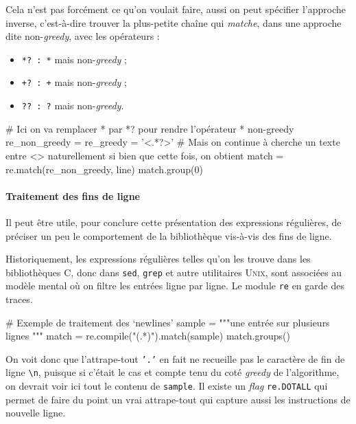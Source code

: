 Cela n'est pas forcément ce qu'on voulait faire, aussi on peut spécifier l'approche inverse, c'est-à-dire trouver la plus-petite chaîne qui \textit{matche}, dans une approche dite non-\textit{greedy}, avec les opérateurs :
\begin{itemize}\jazzitem
\item \texttt{*? : *} mais non-\textit{greedy} ;
\item \texttt{+? : +} mais non-\textit{greedy} ;
\item \texttt{?? : ?} mais non-\textit{greedy}.
\end{itemize}

\begin{idleconsole*}
	\begin{pyconsole}
# Ici on va remplacer * par *? pour rendre l'opérateur * non-greedy
re_non_greedy = re_greedy = '<.*?>'
# Mais on continue à cherche un texte entre <> naturellement si bien que cette fois, on obtient
match = re.match(re_non_greedy, line)
match.group(0)
	\end{pyconsole}
\end{idleconsole*}

\vspace{1pt}%

\paragraph{Traitement des fins de ligne}
Il peut être utile, pour con\-clure cette présentation des expressions régulières, de préciser un peu le comportement de la bibliothèque vis-à-vis des fins de ligne.

Historiquement, les expressions régulières telles qu'on les trouve dans les bibliothèques C, donc dans \texttt{sed}, \texttt{grep} et autre utilitaires \textsc{Unix}, sont associées au modèle mental où on filtre les entrées ligne par ligne.
Le module \texttt{re} en garde des traces.

\begin{idleconsole}
	\begin{pyconsole}
# Exemple de traitement des `newlines'
sample = """une entrée 
sur
plusieurs
lignes
"""
match = re.compile("(.*)").match(sample)
match.groups()
\end{pyconsole}
\end{idleconsole}

On voit donc que l'attrape-tout \texttt{'.'} en fait ne recueille pas le caractère de fin de ligne \texttt{\textbackslash{n}}, puisque si c'était le cas et compte tenu du coté \textit{greedy} de l'algorithme, on devrait voir ici tout le contenu de \texttt{sample}. Il existe un \textit{flag} \texttt{re.DOTALL} qui permet de faire du point un vrai attrape-tout qui capture aussi les instructions de nouvelle ligne.

